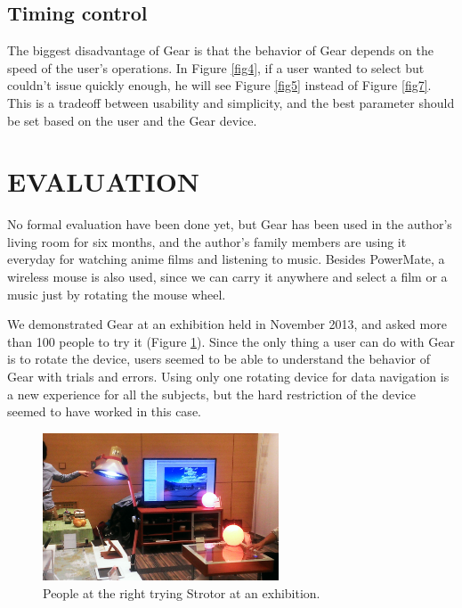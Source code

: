 \documentclass{article}
\begin{document}

\subsection{Timing control}

The biggest disadvantage of Gear is that
the behavior of Gear depends on the speed of the user's operations.
In Figure \ref{fig4},
if a user wanted to select  but couldn't issue {\D}
quickly enough, he will see Figure \ref{fig5} instead of Figure \ref{fig7}.
This is a tradeoff between usability and simplicity, and
the best parameter should be set based on the user and the Gear device.

\section*{EVALUATION}

No formal evaluation have been done yet, but Gear has been used in the author's
living room for six months, and the author's family members are using it
everyday for watching anime films and listening to music.
Besides PowerMate, a wireless mouse is also used,
since we can carry it anywhere and select
a film or a music just by rotating the mouse wheel.

We demonstrated Gear at an exhibition
held in November 2013, and asked more than 100 people to try it
(Figure \ref{exhibition}).
%
Since the only thing a user can do with Gear is to rotate the device,
users seemed to be able to understand the behavior of Gear with trials and errors.
% 
% 
Using only one rotating device for data navigation is a new experience for
all the subjects, but the hard restriction of the device seemed to have worked in this case.

\begin{figure}[H]
\centerline{\includegraphics[width=70mm,bb=0 0 527 329]{figures/c520d5dfbd06c532d48d324a7019b00c.png}}
\caption{People at the right trying Strotor at an exhibition.}
\label{exhibition}
\end{figure}
\end{document}
